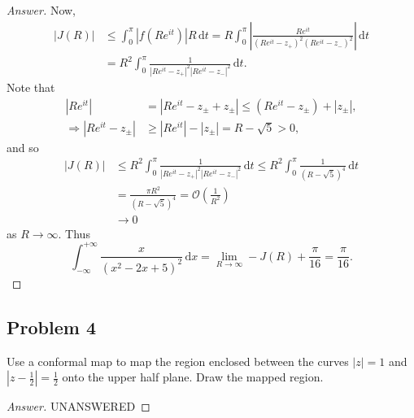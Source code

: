 \documentclass[12pt]{article}
\newcommand\paren[1]{\left( #1 \right)}
\newcommand{\abs}[1]{\left| #1 \right|}
\renewcommand{\i}[4]{\int_{#1}^{#2} {#3} \, \mathrm{d} {#4} }
\theoremstyle{definition}
\begin{document}
\begin{proof}[Answer]
    Now, 
    \begin{align*}
        \abs{ J(R) } & \leq \i{0}{\pi}{ \abs{ f \paren{ Re^{it} } } R }{t} = R \i{0}{\pi}{ \abs{ \frac{ Re^{it} }{ \paren{ Re^{it} - z_{+} }^2 \paren{ Re^{it} - z_{-} }^2 } } }{t} \\ 
        & = R^2 \i{0}{\pi}{ \frac{1}{ \abs{ Re^{it} - z_{+} }^2 \abs{ Re^{it} - z_{-} }^2 } }{t} .
    \end{align*}
    Note that 
    \begin{align*}
        \abs{ Re^{it} } & = \abs{ Re^{it} - z_{\pm} + z_{\pm} } \leq \paren{ Re^{it} - z_{\pm} } + \abs{ z_{\pm} } , \\ 
        \Rightarrow \abs{ Re^{it} - z_{\pm} } & \geq \abs{ Re^{it} } - \abs{ z_{\pm} } = R - \sqrt{5} > 0 , 
    \end{align*}
    and so 
    \begin{align*}
        \abs{ J(R) } & \leq R^2 \i{0}{\pi}{ \frac{1}{ \abs{ Re^{it} - z_{+} }^2 \abs{ Re^{it} - z_{-} }^2 } }{t} \leq R^2 \i{0}{\pi}{ \frac{1}{ \paren{ R - \sqrt{5} }^4 } }{t} \\ 
        & = \frac{\pi R^2}{\paren{ R - \sqrt{5} }^4} = \mathcal{O} \paren{ \frac{1}{R^2} } \\ 
        & \to 0
    \end{align*}
    as $R \to \infty$. Thus 
    \[
        \i{-\infty}{+\infty}{ \frac{x}{\paren{x^2 - 2x + 5 }^2} }{x} = \lim\limits_{R \to \infty} -J(R) + \frac{\pi}{16} = \boxed{ \frac{\pi}{16} . }
    \]
\end{proof}

\subsection{Problem 4}
Use a conformal map to map the region enclosed between the curves $\abs{ z } = 1$ and $| z - \frac{1}{2} | = \frac{1}{2}$ onto the upper half plane. Draw the mapped region. 
\begin{proof}[Answer]
    UNANSWERED
\end{proof}
\end{document}
